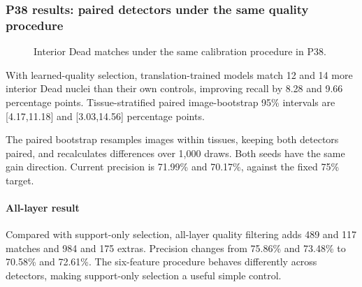 \documentclass[
  12pt,
]{article}
\begin{document}
\subsubsection{P38 results: paired detectors under the same quality procedure}\label{chapter36}
\begin{figure}[H]\centering\caption{Interior Dead matches under the same calibration procedure in P38.}\end{figure}
With learned-quality selection, translation-trained models match 12 and 14 more interior Dead nuclei than their own controls, improving recall by 8.28 and 9.66 percentage points. Tissue-stratified paired image-bootstrap 95\% intervals are [4.17,11.18] and [3.03,14.56] percentage points.

The paired bootstrap resamples images within tissues, keeping both detectors paired, and recalculates differences over 1,000 draws. Both seeds have the same gain direction. Current precision is 71.99\% and 70.17\%, against the fixed 75\% target.

\paragraph{All-layer result}
Compared with support-only selection, all-layer quality filtering adds 489 and 117 matches and 984 and 175 extras. Precision changes from 75.86\% and 73.48\% to 70.58\% and 72.61\%. The six-feature procedure behaves differently across detectors, making support-only selection a useful simple control.
\end{document}
